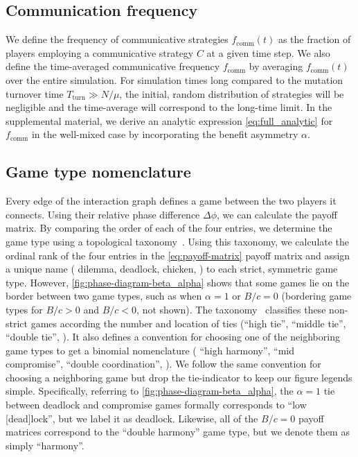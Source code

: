 \documentclass[pdflatex,lineno,referee,sn-nature]{sn-jnl}
\begin{document}
\subsection{Communication frequency}
We define the frequency of communicative strategies
$f_{\text{comm}}(t)$ as the fraction of players employing
a communicative strategy $C$ at a given time step.
We also define the time-averaged communicative frequency
$f_{\text{comm}}$
by averaging $f_{\text{comm}}(t)$ over the entire simulation.
For simulation times long compared to the mutation turnover time
$T_{\text{turn}} \gg N/\mu$,
the initial, random distribution of strategies will be negligible
and the time-average will correspond to the long-time limit.
In the supplemental material,
we derive an analytic expression \cref{eq:full_analytic} for
$f_{\text{comm}}$ in the well-mixed case
by incorporating the benefit asymmetry $\alpha$.

\subsection{Game type nomenclature}
\label{sec:game-type-nomenclature}
Every edge of the interaction graph
defines a game between the two players it connects.
Using their relative phase difference $\Delta \phi$,
we can calculate the payoff matrix.
By comparing the order of each of the four entries,
we determine the game type using
a topological taxonomy~\citep{bruns2015names}.
Using this taxonomy, we calculate the ordinal rank of the four entries
in the \cref{eq:payoff-matrix} payoff matrix
and assign a unique name (\eg{} dilemma, deadlock, chicken, \etc{})
to each strict, symmetric game type.
However, \cref{fig:phase-diagram-beta_alpha}
shows that some games lie on the border between two game types,
such as when $\alpha = 1$ or $B/c = 0$
(bordering game types for $B/c > 0$ and $B/c < 0$, not shown).
The taxonomy~\citep{bruns2015names} classifies these non-strict games
according the number and location of ties (``high tie'', ``middle tie'',
``double tie'', \etc{}).
It also defines a convention for choosing one of the neighboring game types
to get a binomial nomenclature (\eg{} ``high harmony'', ``mid compromise'',
``double coordination'', \etc{}).
We follow the same convention for choosing a neighboring game
but drop the tie-indicator to keep our figure legends simple.
Specifically, referring to \cref{fig:phase-diagram-beta_alpha},
the $\alpha = 1$ tie between deadlock and compromise games
formally corresponds to ``low [dead]lock'',
but we label it as deadlock.
Likewise, all of the $B/c = 0$ payoff matrices
correspond to the ``double harmony'' game type,
but we denote them as simply ``harmony''.
\end{document}
